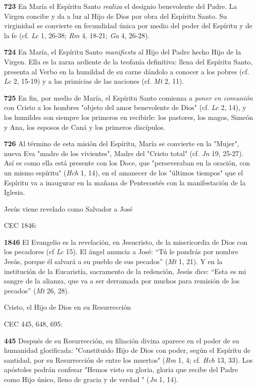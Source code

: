\documentclass[]{article}
\begin{document}
\textbf{723} En María el Espíritu Santo \emph{realiza} el designio
benevolente del Padre. La Virgen concibe y da a luz al Hijo de Dios por
obra del Espíritu Santo. Su virginidad se convierte en fecundidad única
por medio del poder del Espíritu y de la fe (cf. \emph{Lc} 1, 26-38;
\emph{Rm} 4, 18-21; \emph{Ga} 4, 26-28).

\textbf{724} En María, el Espíritu Santo \emph{manifiesta} al Hijo del
Padre hecho Hijo de la Virgen. Ella es la zarza ardiente de la teofanía
definitiva: llena del Espíritu Santo, presenta al Verbo en la humildad
de su carne dándolo a conocer a los pobres (cf. \emph{Lc} 2, 15-19) y a
las primicias de las naciones (cf. \emph{Mt} 2, 11).

\textbf{725} En fin, por medio de María, el Espíritu Santo comienza a
\emph{poner en comunión} con Cristo a los hombres "objeto del amor
benevolente de Dios" (cf. \emph{Lc} 2, 14), y los humildes son siempre
los primeros en recibirle: los pastores, los magos, Simeón y Ana, los
esposos de Caná y los primeros discípulos.

\textbf{726} Al término de esta misión del Espíritu, María se convierte
en la "Mujer", nueva Eva "madre de los vivientes", Madre del "Cristo
total" (cf. \emph{Jn} 19, 25-27). Así es como ella está presente con los
Doce, que "perseveraban en la oración, con un mismo espíritu"
(\emph{Hch} 1, 14), en el amanecer de los "últimos tiempos" que el
Espíritu va a inaugurar en la mañana de Pentecostés con la manifestación
de la Iglesia.

Jesús viene revelado como Salvador a José

CEC 1846:

\textbf{1846} El Evangelio es la revelación, en Jesucristo, de la
misericordia de Dios con los pecadores (cf \emph{Lc} 15). El ángel
anuncia a José: ``Tú le pondrás por nombre Jesús, porque él salvará a su
pueblo de sus pecados'' (\emph{Mt} 1, 21). Y en la institución de la
Eucaristía, sacramento de la redención, Jesús dice: ``Esta es mi sangre
de la alianza, que va a ser derramada por muchos para remisión de los
pecados'' (\emph{Mt} 26, 28).

Cristo, el Hijo de Dios en su Resurrección

CEC 445, 648, 695:

\textbf{445} Después de su Resurrección, su filiación divina aparece en
el poder de su humanidad glorificada: "Constituido Hijo de Dios con
poder, según el Espíritu de santidad, por su Resurrección de entre los
muertos" (\emph{Rm} 1, 4; cf. \emph{Hch} 13, 33). Los apóstoles podrán
confesar "Hemos visto su gloria, gloria que recibe del Padre como Hijo
único, lleno de gracia y de verdad " (\emph{Jn} 1, 14).
\end{document}
